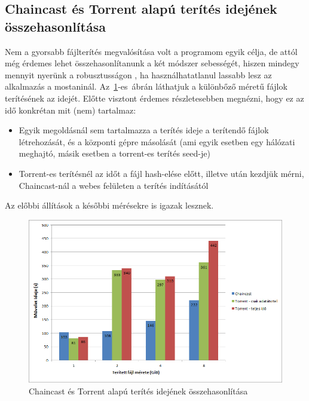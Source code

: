 %
\subsection{Chaincast és Torrent alapú terítés idejének összehasonlítása}
%

Nem a gyorsabb fájlterítés megvalósítása volt a programom egyik célja, de attól még érdemes lehet összehasonlítanunk a két módszer sebességét, hiszen mindegy mennyit nyerünk a robusztusságon , ha használhatatlanul lassabb lesz az alkalmazás a mostaninál. Az~\ref{fig:chaincasttorrrentcomparison}-es~ábrán láthatjuk a különbőző méretű fájlok terítésének az idejét. Előtte visztont érdemes részletesebben megnézni, hogy ez az idő konkrétan mit (nem) tartalmaz:

\begin{itemize}
  \item Egyik megoldásnál sem tartalmazza a terítés ideje a terítendő fájlok létrehozását, és a központi gépre másolását (ami egyik esetben egy hálózati meghajtó, másik esetben a torrent-es terítés seed-je)
  \item Torrent-es terítésnél az időt a fájl hash-elése előtt, illetve után kezdjük mérni, Chaincast-nál a webes felületen a terítés indításától
\end{itemize}

Az előbbi állítások a későbbi mérésekre is igazak lesznek.

\begin{figure}[ht]
\centering
\includegraphics[width=150mm, keepaspectratio]{figures/Perf_chaincast_torrent_comparison.png}
\caption{Chaincast és Torrent alapú terítés idejének összehasonlítása}
\label{fig:chaincasttorrrentcomparison}
\end{figure}


